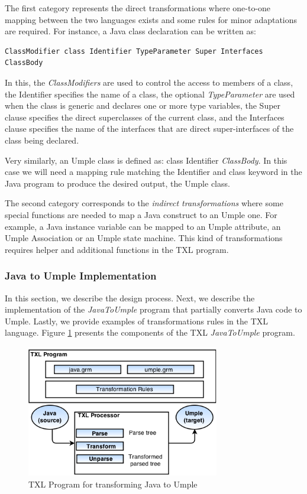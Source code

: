 The first category represents the direct transformations where one-to-one mapping between the two languages exists and some rules for minor adaptations are required. For instance, a Java class declaration can be written as: 

\vspace{\baselineskip}
\begin{lstlisting}[style=umplePlain]
ClassModifier class Identifier TypeParameter Super Interfaces ClassBody
\end{lstlisting}

In this, the \textit{ClassModifiers} are used to control the access to members of a class, the Identifier specifies the name of a class, the optional \textit{TypeParameter} are used when the class is generic and declares one or more type variables, the Super clause specifies the direct superclasses of the current class, and the Interfaces clause specifies the name of the interfaces that are direct super-interfaces of the class being declared.

Very similarly, an Umple class is defined as: class Identifier \textit{ClassBody}. In this case we will need a mapping rule matching the Identifier and class keyword in the Java program to produce the desired output, the Umple class. 

The second category corresponds to the \textit{indirect transformations} where some special functions are needed to map a Java construct to an Umple one. For example, a Java instance variable can be mapped to an Umple attribute, an Umple Association or an Umple state machine. This kind of transformations requires helper and additional functions in the TXL program. 

\subsubsection{Java to Umple Implementation}

In this section, we describe the design process. Next, we describe the implementation of the \textit{JavaToUmple} program that partially converts Java code to Umple. Lastly, we provide examples of transformations rules in the TXL language. Figure \ref{fig:txl} presents the components of the TXL \textit{JavaToUmple} program. 

\begin{figure}[h]
\centering
\includegraphics[width=0.75\textwidth]{Figures/TXLprogram.png} 
\caption{TXL Program for transforming Java to Umple}
\label{fig:txl}
\end{figure}

